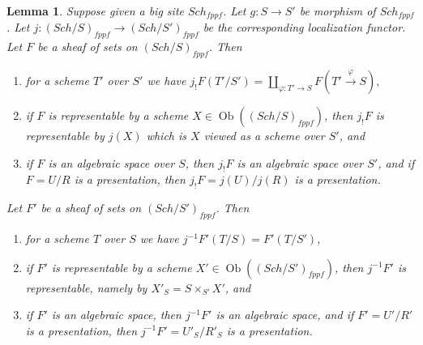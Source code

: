 \documentclass[10pt,a4paper]{amsart}
\theoremstyle{plain}
\newtheorem{lemma}[subsection]{Lemma}
\theoremstyle{definition}
\theoremstyle{remark}
\numberwithin{equation}{subsection}
\def\Sch{\mathit{Sch}}
\def\Ob{\mathop{\mathrm{Ob}}\nolimits}
\begin{document}
\begin{lemma}
\label{lemma-change-base-scheme}
Suppose given a big site $\Sch_{fppf}$.
Let $g : S \to S'$ be morphism of $\Sch_{fppf}$.
Let $j : (\Sch/S)_{fppf} \to (\Sch/S')_{fppf}$ be
the corresponding localization functor.
Let $F$ be a sheaf of sets on $(\Sch/S)_{fppf}$.
Then
\begin{enumerate}
\item for a scheme $T'$ over $S'$ we have
$j_!F(T'/S') =
\coprod\nolimits_{\varphi : T' \to S} F(T' \xrightarrow{\varphi} S),$
\item if $F$ is representable by a scheme
$X \in \Ob((\Sch/S)_{fppf})$,
then $j_!F$ is representable by $j(X)$ which is
$X$ viewed as a scheme over $S'$, and
\item if $F$ is an algebraic space over $S$, then $j_!F$ is an algebraic
space over $S'$, and if $F = U/R$ is a presentation, then
$j_!F = j(U)/j(R)$ is a presentation.
\end{enumerate}
Let $F'$ be a sheaf of sets on $(\Sch/S')_{fppf}$. Then
\begin{enumerate}
\item[(4)] for a scheme $T$ over $S$ we have $j^{-1}F'(T/S) = F'(T/S')$,
\item[(5)] if $F'$ is representable by a scheme
$X' \in \Ob((\Sch/S')_{fppf})$, then
$j^{-1}F'$ is representable, namely by $X'_S = S \times_{S'} X'$, and
\item[(6)] if $F'$ is an algebraic space, then
$j^{-1}F'$ is an algebraic space, and if $F' = U'/R'$ is a presentation,
then $j^{-1}F' = U'_S/R'_S$ is a presentation.
\end{enumerate}
\end{lemma}
\end{document}

